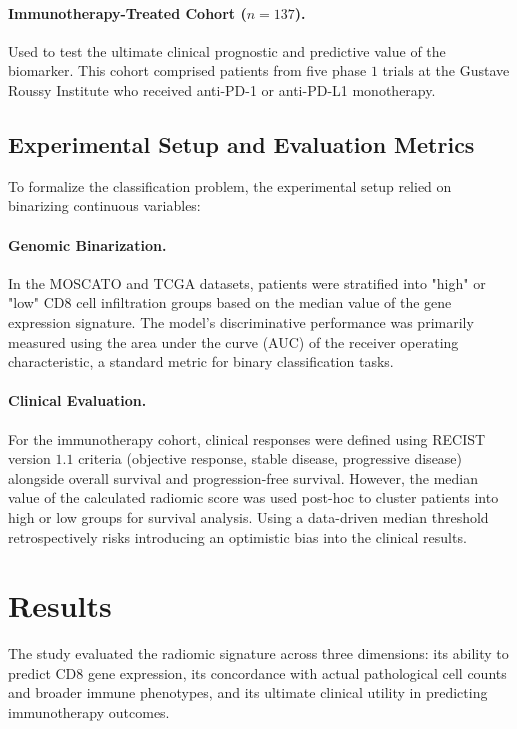 \documentclass[10pt]{article}
\begin{document}
\paragraph{Immunotherapy-Treated Cohort ($n=137$).} Used to test the ultimate clinical prognostic and predictive value of the biomarker. This cohort comprised patients from five phase $1$ trials at the Gustave Roussy Institute who received anti-PD-1 or anti-PD-L1 monotherapy.

\subsection{Experimental Setup and Evaluation Metrics}
To formalize the classification problem, the experimental setup relied on binarizing continuous variables:
\paragraph{Genomic Binarization.} In the MOSCATO and TCGA datasets, patients were stratified into "high" or "low" CD8 cell infiltration groups based on the median value of the gene expression signature. The model's discriminative performance was primarily measured using the area under the curve (AUC) of the receiver operating characteristic, a standard metric for binary classification tasks.
\paragraph{Clinical Evaluation.} For the immunotherapy cohort, clinical responses were defined using RECIST version $1.1$ criteria (objective response, stable disease, progressive disease) alongside overall survival and progression-free survival. However, the median value of the calculated radiomic score was used post-hoc to cluster patients into high or low groups for survival analysis. Using a data-driven median threshold retrospectively risks introducing an optimistic bias into the clinical results.


\section{Results}
The study evaluated the radiomic signature across three dimensions: its ability to predict CD8 gene expression, its concordance with actual pathological cell counts and broader immune phenotypes, and its ultimate clinical utility in predicting immunotherapy outcomes.
\end{document}
